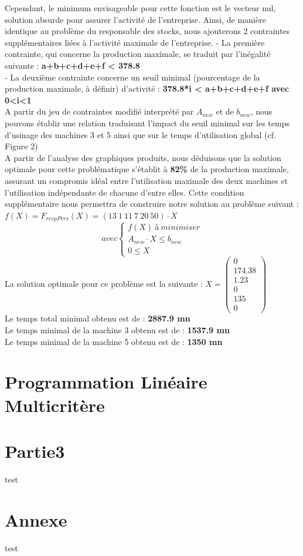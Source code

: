 \documentclass[a4paper, 11pt]{article}
\begin{document}
Cependant, le minimum envisageable pour cette fonction est le vecteur nul, solution absurde pour assurer l'activité de l'entreprise. Ainsi, de manière identique au problème du responsable des stocks, nous ajouterons 2 contraintes supplémentaires liées à l'activité maximale de l'entreprise.
- La première contrainte, qui concerne la production maximale, se traduit par l'inégalité suivante :
\textbf{a+b+c+d+e+f < 378.8}\\
- La deuxième contrainte concerne un seuil minimal (pourcentage de la production maximale, à définir) d'activité :
\textbf{ 378.8*i < a+b+c+d+e+f avec 0<i<1}\\
A partir du jeu de contraintes modifié interprété par \textbf{$A_{new}$} et de \textbf{$b_{new}$}, nous pouvons établir une relation traduisant l'impact du seuil minimal sur les temps d'usinage des machines 3 et 5 ainsi que sur le temps d'utilisation global (cf. Figure 2)\\
A partir de l'analyse des graphiques produits, nous déduisons que la solution optimale pour cette problématique s'établit à \textbf{82\%} de la production maximale, assurant un compromis idéal entre l'utilisation maximale des deux machines et l'utilisation indépendante de chacune d'entre elles.
Cette condition supplémentaire nous permettra de construire notre solution au problème suivant :
$f(X) = F_{respPers} (X) =(13~1~11~7~20~50)\cdot X$ \\
$$
avec \left\{\begin{split}
	f(X)\ à\ minimiser\\
    A_{new}\cdot X \leq b_{new}\\
    0 \leq X
\end{split}\right.
$$
La solution optimale pour ce problème est la suivante :
$ X =\begin{pmatrix}
0\\
174.38\\
1.23\\
0\\
135\\
0
\end{pmatrix} $\\
Le temps total minimal obtenu est de : \textbf{2887.9 mn}\\
Le temps minimal de la machine 3 obtenu est de : \textbf{1537.9 mn}\\
Le temps minimal de la machine 5 obtenu est de : \textbf{1350 mn}

\section{Programmation Linéaire Multicritère}

\section{Partie3}
test

\section*{Annexe}
test
\end{document}

